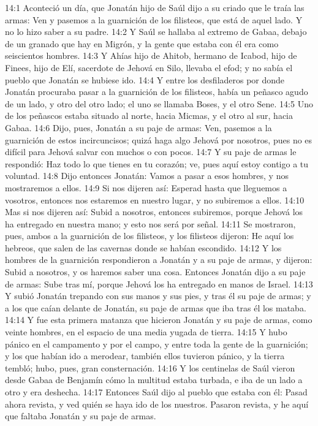14:1 Aconteció un día, que Jonatán hijo de Saúl dijo a su criado que le traía las armas: Ven y pasemos a la guarnición de los filisteos, que está de aquel lado. Y no lo hizo saber a su padre.  
14:2 Y Saúl se hallaba al extremo de Gabaa, debajo de un granado que hay en Migrón, y la gente que estaba con él era como seiscientos hombres.  
14:3 Y Ahías hijo de Ahitob, hermano de Icabod, hijo de Finees, hijo de Elí, sacerdote de Jehová en Silo, llevaba el efod; y no sabía el pueblo que Jonatán se hubiese ido.  
14:4 Y entre los desfiladeros por donde Jonatán procuraba pasar a la guarnición de los filisteos, había un peñasco agudo de un lado, y otro del otro lado; el uno se llamaba Boses, y el otro Sene.  
14:5 Uno de los peñascos estaba situado al norte, hacia Micmas, y el otro al sur, hacia Gabaa.  
14:6 Dijo, pues, Jonatán a su paje de armas: Ven, pasemos a la guarnición de estos incircuncisos; quizá haga algo Jehová por nosotros, pues no es difícil para Jehová salvar con muchos o con pocos.  
14:7 Y su paje de armas le respondió: Haz todo lo que tienes en tu corazón; ve, pues aquí estoy contigo a tu voluntad.  
14:8 Dijo entonces Jonatán: Vamos a pasar a esos hombres, y nos mostraremos a ellos.  
14:9 Si nos dijeren así: Esperad hasta que lleguemos a vosotros, entonces nos estaremos en nuestro lugar, y no subiremos a ellos.  
14:10 Mas si nos dijeren así: Subid a nosotros, entonces subiremos, porque Jehová los ha entregado en nuestra mano; y esto nos será por señal.  
14:11 Se mostraron, pues, ambos a la guarnición de los filisteos, y los filisteos dijeron: He aquí los hebreos, que salen de las cavernas donde se habían escondido.  
14:12 Y los hombres de la guarnición respondieron a Jonatán y a su paje de armas, y dijeron: Subid a nosotros, y os haremos saber una cosa. Entonces Jonatán dijo a su paje de armas: Sube tras mí, porque Jehová los ha entregado en manos de Israel.  
14:13 Y subió Jonatán trepando con sus manos y sus pies, y tras él su paje de armas; y a los que caían delante de Jonatán, su paje de armas que iba tras él los mataba.  
14:14 Y fue esta primera matanza que hicieron Jonatán y su paje de armas, como veinte hombres, en el espacio de una media yugada de tierra.  
14:15 Y hubo pánico en el campamento y por el campo, y entre toda la gente de la guarnición; y los que habían ido a merodear, también ellos tuvieron pánico, y la tierra tembló; hubo, pues, gran consternación.  
14:16 Y los centinelas de Saúl vieron desde Gabaa de Benjamín cómo la multitud estaba turbada, e iba de un lado a otro y era deshecha.  
14:17 Entonces Saúl dijo al pueblo que estaba con él: Pasad ahora revista, y ved quién se haya ido de los nuestros. Pasaron revista, y he aquí que faltaba Jonatán y su paje de armas.  
